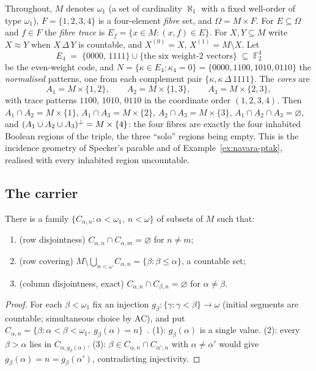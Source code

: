 Throughout, $M$ denotes $\omega_1$ (a set of cardinality $\aleph_1$ with a fixed
well-order of type $\omega_1$), $F=\{1,2,3,4\}$ is a four-element \emph{fibre}
set, and $\Omega = M\times F$. For $E\subseteq\Omega$ and $f\in F$ the
\emph{fibre trace} is $E_f = \{x\in M : (x,f)\in E\}$. For $X,Y\subseteq M$ write
$X\approx Y$ when $X\,\Delta\,Y$ is countable, and $X^{(0)}=X$,
$X^{(1)}=M\setminus X$. Let
\[
  E_4 \;=\; \{0000,\,1111\}\cup\{\text{the six weight-2 vectors}\}
  \;\subseteq\;\mathbb F_2^4
\]
be the even-weight code, and $N=\{\kappa\in E_4 : \kappa_4=0\}
= \{0000, 1100, 1010, 0110\}$ the \emph{normalised} patterns, one from each
complement pair $\{\kappa,\kappa\,\Delta\,1111\}$. The \emph{cores} are
\[
  A_1 = M\times\{1,2\},\qquad A_2 = M\times\{1,3\},\qquad A_3 = M\times\{2,3\},
\]
with trace patterns $1100$, $1010$, $0110$ in the coordinate order $(1,2,3,4)$.
Then $A_1\cap A_2 = M\times\{1\}$, $A_1\cap A_3 = M\times\{2\}$,
$A_2\cap A_3 = M\times\{3\}$, $A_1\cap A_2\cap A_3 = \varnothing$, and
$(A_1\cup A_2\cup A_3){}^{\perp} = M\times\{4\}$: the four fibres are exactly the four
inhabited Boolean regions of the triple, the three ``solo'' regions being empty.
This is the incidence geometry of Specker's parable and of
Example~\ref{ex:navara-ptak}, realised with every inhabited region uncountable.

\subsection{The carrier}

\begin{lemma}\label{lem:ulam}
There is a family $\{C_{\alpha,n} : \alpha<\omega_1,\ n<\omega\}$ of subsets of
$M$ such that:
\begin{enumerate}[label=\textup{(\arabic*)}]
  \item (row disjointness) $C_{\alpha,n}\cap C_{\alpha,m}=\varnothing$ for $n\neq m$;
  \item (row covering) $M\setminus\bigcup_{n<\omega}C_{\alpha,n}
    = \{\beta:\beta\le\alpha\}$, a countable set;
  \item (column disjointness, exact) $C_{\alpha,n}\cap C_{\beta,n}=\varnothing$
    for $\alpha\neq\beta$.
\end{enumerate}
\end{lemma}

\begin{proof}
For each $\beta<\omega_1$ fix an injection $g_\beta\colon\{\gamma:\gamma<\beta\}\to\omega$
(initial segments are countable; simultaneous choice by AC), and put
$C_{\alpha,n}=\{\beta : \alpha<\beta<\omega_1,\ g_\beta(\alpha)=n\}$~\cite{Ulam1930}.
(1): $g_\beta(\alpha)$ is a single value. (2): every $\beta>\alpha$ lies in
$C_{\alpha,g_\beta(\alpha)}$. (3): $\beta\in C_{\alpha,n}\cap C_{\alpha',n}$ with
$\alpha\neq\alpha'$ would give $g_\beta(\alpha)=n=g_\beta(\alpha')$, contradicting
injectivity.
\end{proof}

